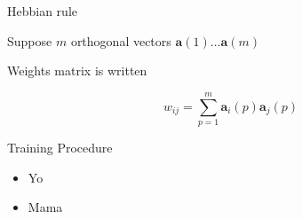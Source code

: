 \documentclass{beamer}
\begin{document}
\begin{frame}{Hebbian rule}

Suppose \(m\) orthogonal vectors \(\mathbf{a}(1) \ldots \mathbf{a}(m)\)

Weights matrix is written

\begin{equation}
    w_{ij} = \sum_{p=1}^m \mathbf{a}_i(p) \mathbf{a}_j(p)
\end{equation}

\end{frame}

\begin{frame}{Training Procedure}
    \begin{itemize}
        \item Yo
        \item Mama
    \end{itemize}
\end{frame}
\end{document}
